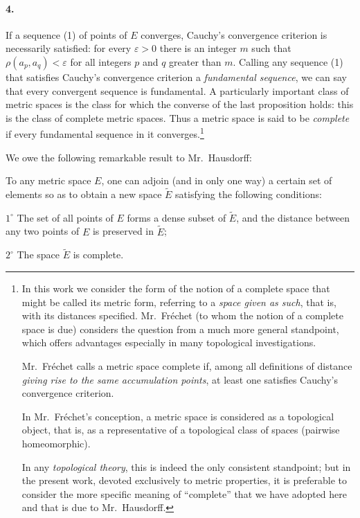 \documentclass[a4paper,12pt]{amsart}
\newcommand{\srcpage}[1]{} %
\begin{document}
\paragraph{4.}
If a sequence (1) of points of $E$ converges, Cauchy's convergence criterion is necessarily satisfied: for every $\varepsilon>0$ there is an integer $m$ such that $\rho(a_p,a_q)<\varepsilon$ for all integers $p$ and $q$ greater than $m$. Calling any sequence (1) that satisfies Cauchy's convergence criterion a \textit{fundamental sequence}, we can say that every convergent sequence is fundamental. A particularly important class of metric spaces is the class for which the converse of the last proposition holds: this is the class of complete metric spaces. Thus a metric space is said to be \textit{complete} if every fundamental sequence in it converges.\footnote{In this work we consider the form of the notion of a complete space that might be called its metric form, referring to a \textit{space given as such}, that is, with its distances specified. Mr.~Fréchet (to whom the notion of a complete space is due) considers the question from a much more general standpoint, which offers advantages especially in many topological investigations.

Mr.~Fréchet calls a metric space complete if, among all definitions of distance \textit{giving rise to the same accumulation points}, at least one satisfies Cauchy's convergence criterion.

In Mr.~Fréchet's conception, a metric space is considered as a topological object, that is, as a representative of a topological class of spaces (pairwise homeomorphic).

In any \textit{topological theory}, this is indeed the only consistent standpoint; but in the present work, devoted exclusively to metric properties, it is preferable to consider the more specific meaning of ``complete'' that we have adopted here and that is due to Mr.~Hausdorff.}

We owe the following remarkable result to Mr.~Hausdorff:

To any metric space $E$, one can adjoin (and in only one way) a certain set of elements so as to obtain a new space $\widetilde{E}$ satisfying the following conditions:

$1^\circ$ The set of all points of $E$ forms a dense subset of $\widetilde{E}$, and the distance between any two points of $E$ is preserved in $\widetilde{E}$;
\srcpage{47}

$2^\circ$ The space $\widetilde{E}$ is complete.
\end{document}
